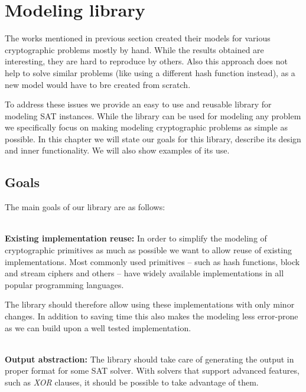 \section{Modeling library}

The works mentioned in previous section created their models for various cryptographic problems mostly by hand.
While the results obtained are interesting, they are hard to reproduce by others.
Also this approach does not help to solve similar problems (like using a different hash function instead), as a new model would have to bre created from scratch.

To address these issues we provide an easy to use and reusable library for modeling SAT instances.
While the library can be used for modeling any problem we specifically focus on making modeling cryptographic problems as simple as possible.
In this chapter we will state our goals for this library, describe its design and inner functionality.
We will also show examples of its use.

\subsection{Goals}
The main goals of our library are as follows:

~\\
\textbf{Existing implementation reuse:}
In order to simplify the modeling of cryptographic primitives as much as possible we want to allow reuse of existing implementations.
Most commonly used primitives -- such as hash functions, block and stream ciphers and others -- have widely available implementations in all popular programming languages.

The library should therefore allow using these implementations with only minor changes.
In addition to saving time this also makes the modeling less error-prone as we can build upon a well tested implementation.

~\\
\textbf{Output abstraction:}
The library should take care of generating the output in proper format for some SAT solver.
With solvers that support advanced features, such as \emph{XOR} clauses, it should be possible to take advantage of them.

